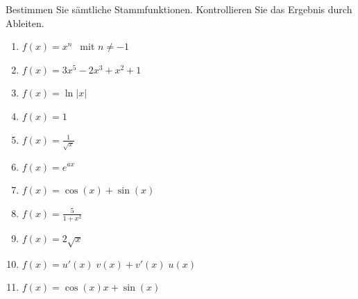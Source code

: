 \begin{ExerciseBlock}
Bestimmen Sie sämtliche Stammfunktionen. Kontrollieren Sie das Ergebnis durch Ableiten.
\begin{enumerate}[label=\alph*)]
	\item $f(x) = x^n \ \ $ mit $n \neq -1$ 
	\item $f(x) = 3x^5-2x^3+x^2+1$
	\item $f(x) = \ln|x|$
	\item $f(x) = 1$
	\item $f(x) = \frac{1}{\sqrt{x}}$
	\item $f(x) = e^{a x}$
	\item $f(x) = \cos(x) + \sin(x)$
	\item $f(x) = \frac{5}{1+x^2}$
	\item $f(x) = 2 \sqrt{x}$  
	\item $f(x) = u'(x) \; v(x) + v'(x) \; u(x)$
	\item $f(x) = \cos(x) x + \sin(x)$
\end{enumerate}

\end{ExerciseBlock}
